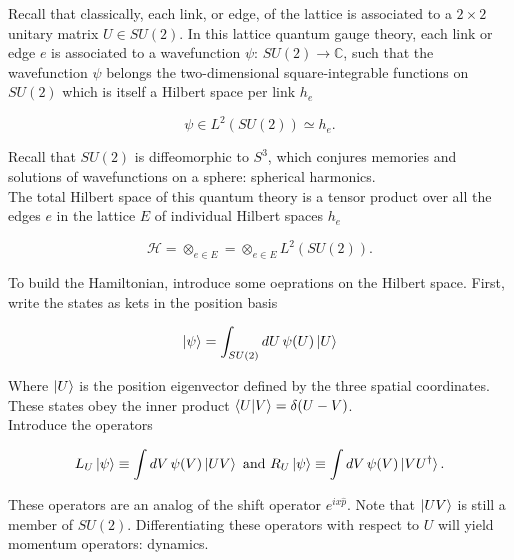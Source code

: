 \noindent Recall that classically, each link, or edge, of the lattice is associated to a $2 \times2$ unitary matrix $U \in SU(2)$. In this lattice quantum gauge theory, each link or edge $e$ is associated to a wavefunction $\psi: \, SU(2) \rightarrow \mathbb{C}$, such that the wavefunction $\psi$ belongs the two-dimensional square-integrable functions on $SU(2)$ which is itself a Hilbert space per link $h_e$

\begin{equation}
\psi \in L^2 (SU(2)) \simeq h_e.
\end{equation}

\noindent Recall that $SU(2)$ is diffeomorphic to $S^3$, which conjures memories and solutions of wavefunctions on a sphere: spherical harmonics. \\

\noindent The total Hilbert space of this quantum theory is a tensor product over all the edges $e$ in the lattice $E$ of individual Hilbert spaces $h_e$

\begin{equation}
\mathcal{H} = \otimes_{e \in E} = \otimes_{e \in E} L^2 (SU(2)).
\end{equation}

\noindent To build the Hamiltonian, introduce some oeprations on the Hilbert space. First, write the states as kets in the position basis

\begin{equation}
\ket{\psi} = \int_{SU(2)} dU \, \psi (U) \ket{U}
\end{equation}

\noindent Where $\ket{U}$ is the position eigenvector defined by the three spatial coordinates. These states obey the inner product $\braket{U|V} = \delta(U-V)$. \\

\noindent Introduce the operators

\begin{equation}
L_U \ket{\psi} \equiv \int dV \, \psi (V) \ket{UV} \,\, \text{and} \,\, R_U \ket{\psi} \equiv \int dV \, \psi(V) \ket{VU^\dagger}.
\end{equation}

\noindent These operators are an analog of the shift operator $e^{ix \hat{p}}$. Note that $\ket{UV}$ is still a member of $SU(2)$. Differentiating these operators with respect to $U$ will yield momentum operators: dynamics.
